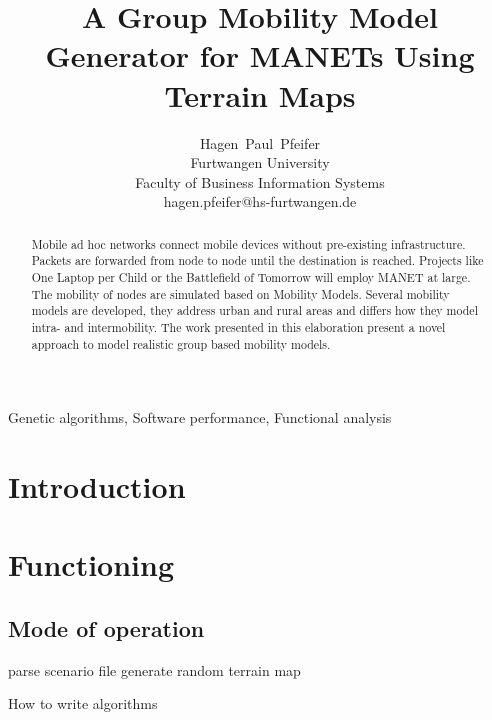 \documentclass[journal]{IEEEtran}
\begin{document}
\newcommand{\ra}[1]{\renewcommand{\arraystretch}{#1}}

\title{A Group Mobility Model Generator for MANETs Using Terrain Maps}

\author{Hagen~Paul~Pfeifer\\Furtwangen University\\Faculty of Business
Information Systems\\hagen.pfeifer@hs-furtwangen.de}



\maketitle


\begin{abstract}
Mobile ad hoc networks connect mobile devices without pre-existing
infrastructure. Packets are forwarded from node to node until the destination is
reached. Projects like One Laptop per Child or the Battlefield of Tomorrow will
employ MANET at large. The mobility of nodes are simulated based on Mobility
Models. Several mobility models are developed, they address urban and rural
areas and differs how they model intra- and intermobility. The work presented in
this elaboration present a novel approach to model realistic group based
mobility models.
\end{abstract}

% 
\begin{keywords}
Genetic algorithms, Software performance, Functional analysis
\end{keywords}
% 
\IEEEpeerreviewmaketitle


\section{Introduction}


\section{Functioning}


\subsection{Mode of operation}

\begin{algorithm}[H]
  \SetLine
  parse scenario file\;
	generate random terrain map\;
  \caption{How to write algorithms}
\end{algorithm}
\end{document}
